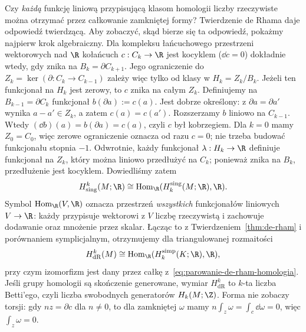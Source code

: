 Czy \emph{każdą} funkcję liniową przypisującą
klasom homologii liczby rzeczywiste można
otrzymać przez całkowanie zamkniętej formy?
Twierdzenie de Rhama daje odpowiedź twierdzącą.
Aby zobaczyć, skąd bierze się ta odpowiedź,
pokażmy najpierw krok algebraiczny.
Dla kompleksu
łańcuchowego przestrzeni wektorowych nad $\R$
kołańcuch $c:C_k\to\R$ jest kocyklem
($\dd c=0$) dokładnie wtedy, gdy znika
na $B_k=\partial C_{k+1}$. Jego ograniczenie
do $Z_k=\ker(\partial:C_k\to C_{k-1})$ zależy
więc tylko od klasy w $H_k=Z_k/B_k$.
Jeżeli ten funkcjonał na $H_k$ jest zerowy,
to $c$ znika na całym $Z_k$. Definiujemy
na $B_{k-1}=\partial C_k$ funkcjonał
$b(\partial a):=c(a)$. Jest dobrze określony:
z $\partial a=\partial a'$ wynika
$a-a'\in Z_k$, a zatem $c(a)=c(a')$.
Rozszerzamy $b$ liniowo na $C_{k-1}$.
Wtedy $(\dd b)(a)=b(\partial a)=c(a)$,
czyli $c$ był kobrzegiem. Dla $k=0$ mamy
$Z_0=C_0$, więc zerowe ograniczenie oznacza od razu $c=0$;
nie trzeba budować funkcjonału stopnia $-1$.
Odwrotnie, każdy
funkcjonał $\lambda:H_k\to\R$ definiuje
funkcjonał na $Z_k$, który można liniowo
przedłużyć na $C_k$; ponieważ znika na
$B_k$, przedłużenie jest kocyklem.
Dowiedliśmy zatem
\[
 H^k_{\mathrm{sing}}(M;\R)
 \cong \operatorname{Hom}_{\R}
       (H_k^{\mathrm{sing}}(M;\R),\R).
\]
Symbol $\operatorname{Hom}_{\R}(V,\R)$ oznacza
przestrzeń \emph{wszystkich} funkcjonałów liniowych
$V\to\R$: każdy przypisuje wektorowi z $V$
liczbę rzeczywistą i zachowuje dodawanie
oraz mnożenie przez skalar.
Łącząc to z Twierdzeniem~\ref{thm:de-rham}
i porównaniem symplicjalnym, otrzymujemy
dla triangulowanej rozmaitości
\begin{equation}\label{eq:porownanie-simp-de-rham}
 H^k_{\mathrm{dR}}(M)
 \cong \operatorname{Hom}_{\R}
       (H_k^{\mathrm{simp}}(K;\R),\R),
\end{equation}
przy czym izomorfizm jest dany przez całkę
z~\eqref{eq:parowanie-de-rham-homologia}.
Jeśli grupy homologii są skończenie generowane,
wymiar $H^k_{\mathrm{dR}}$ to $k$-ta liczba
Betti'ego, czyli liczba swobodnych generatorów
$H_k(M;\Z)$. Forma nie zobaczy torsji: gdy
$nz=\partial c$ dla $n\ne0$, to dla zamkniętej
$\omega$ mamy
$n\int_z\omega=\int_c\dd\omega=0$,
więc $\int_z\omega=0$.

